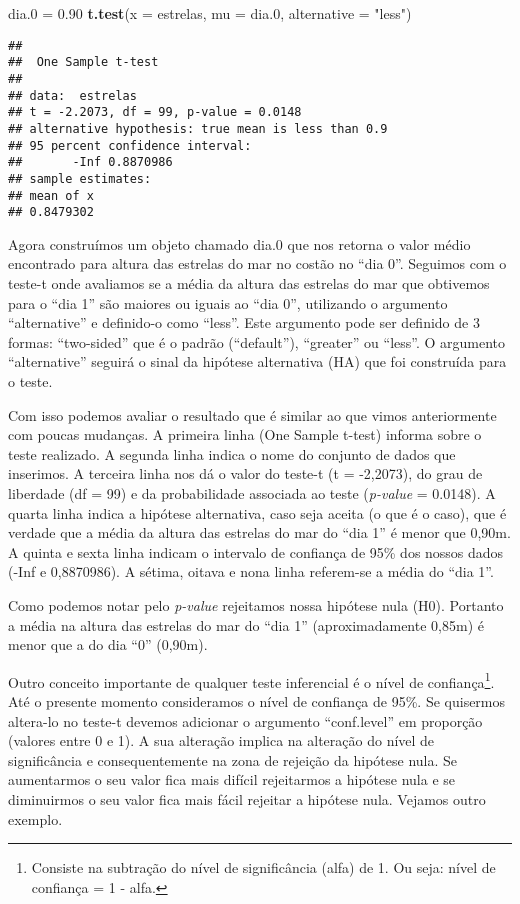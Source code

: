 \documentclass[14pt,titlepage, oneside, openany, a4paper]{book}
\newenvironment{Shaded}{\begin{snugshade}}{\end{snugshade}}
\newcommand{\DataTypeTok}[1]{\textcolor[rgb]{0.13,0.29,0.53}{#1}}
\newcommand{\FloatTok}[1]{\textcolor[rgb]{0.00,0.00,0.81}{#1}}
\newcommand{\KeywordTok}[1]{\textcolor[rgb]{0.13,0.29,0.53}{\textbf{#1}}}
\newcommand{\NormalTok}[1]{#1}
\newcommand{\StringTok}[1]{\textcolor[rgb]{0.31,0.60,0.02}{#1}}
\begin{document}
\begin{Shaded}
\begin{Highlighting}[]
\NormalTok{dia}\FloatTok{.0}\NormalTok{ =}\StringTok{ }\FloatTok{0.90}
\KeywordTok{t.test}\NormalTok{(}\DataTypeTok{x =}\NormalTok{ estrelas, }\DataTypeTok{mu =}\NormalTok{ dia}\FloatTok{.0}\NormalTok{, }\DataTypeTok{alternative =} \StringTok{"less"}\NormalTok{)}
\end{Highlighting}
\end{Shaded}

\begin{verbatim}
## 
##  One Sample t-test
## 
## data:  estrelas
## t = -2.2073, df = 99, p-value = 0.0148
## alternative hypothesis: true mean is less than 0.9
## 95 percent confidence interval:
##       -Inf 0.8870986
## sample estimates:
## mean of x 
## 0.8479302
\end{verbatim}

Agora construímos um objeto chamado dia.0 que nos retorna o valor médio encontrado para altura das estrelas do mar no costão no ``dia 0''. Seguimos com o teste-t onde avaliamos se a média da altura das estrelas do mar que obtivemos para o ``dia 1'' são maiores ou iguais ao ``dia 0'', utilizando o argumento ``alternative'' e definido-o como ``less''. Este argumento pode ser definido de 3 formas: ``two-sided'' que é o padrão (``default''), ``greater'' ou ``less''. O argumento ``alternative'' seguirá o sinal da hipótese alternativa (HA) que foi construída para o teste.

Com isso podemos avaliar o resultado que é similar ao que vimos anteriormente com poucas mudanças. A primeira linha (One Sample t-test) informa sobre o teste realizado. A segunda linha indica o nome do conjunto de dados que inserimos. A terceira linha nos dá o valor do teste-t (t = -2,2073), do grau de liberdade (df = 99) e da probabilidade associada ao teste (\emph{p-value} = 0.0148). A quarta linha indica a hipótese alternativa, caso seja aceita (o que é o caso), que é verdade que a média da altura das estrelas do mar do ``dia 1'' é menor que 0,90m. A quinta e sexta linha indicam o intervalo de confiança de 95\% dos nossos dados (-Inf e 0,8870986). A sétima, oitava e nona linha referem-se a média do ``dia 1''.

Como podemos notar pelo \emph{p-value} rejeitamos nossa hipótese nula (H0). Portanto a média na altura das estrelas do mar do ``dia 1'' (aproximadamente 0,85m) é menor que a do dia ``0'' (0,90m).

Outro conceito importante de qualquer teste inferencial é o nível de confiança\footnote{Consiste na subtração do nível de significância (alfa) de 1. Ou seja: nível de confiança = 1 - alfa.}. Até o presente momento consideramos o nível de confiança de 95\%. Se quisermos altera-lo no teste-t devemos adicionar o argumento ``conf.level'' em proporção (valores entre 0 e 1). A sua alteração implica na alteração do nível de significância e consequentemente na zona de rejeição da hipótese nula. Se aumentarmos o seu valor fica mais difícil rejeitarmos a hipótese nula e se diminuirmos o seu valor fica mais fácil rejeitar a hipótese nula. Vejamos outro exemplo.
\end{document}

